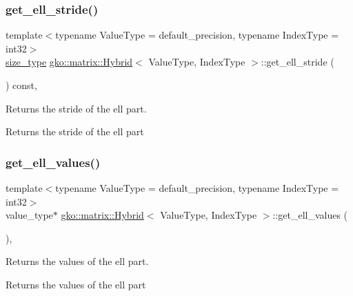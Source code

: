 \subsubsection{\texorpdfstring{get\+\_\+ell\+\_\+stride()}{get\_ell\_stride()}}
{\footnotesize\ttfamily template$<$typename Value\+Type = default\+\_\+precision, typename Index\+Type = int32$>$ \\
\hyperlink{namespacegko_a6e5c95df0ae4e47aab2f604a22d98ee7}{size\+\_\+type} \hyperlink{classgko_1_1matrix_1_1Hybrid}{gko\+::matrix\+::\+Hybrid}$<$ Value\+Type, Index\+Type $>$\+::get\+\_\+ell\+\_\+stride (\begin{DoxyParamCaption}{ }\end{DoxyParamCaption}) const\hspace{0.3cm}{\ttfamily [inline]}, {\ttfamily [noexcept]}}



Returns the stride of the ell part. 

\begin{DoxyReturn}{Returns}
the stride of the ell part 
\end{DoxyReturn}
\mbox{\label{classgko_1_1matrix_1_1Hybrid_a9cd9c8b8dbf8b3c2c014f355faa61474}} 
\subsubsection{\texorpdfstring{get\+\_\+ell\+\_\+values()}{get\_ell\_values()}}
{\footnotesize\ttfamily template$<$typename Value\+Type = default\+\_\+precision, typename Index\+Type = int32$>$ \\
value\+\_\+type$\ast$ \hyperlink{classgko_1_1matrix_1_1Hybrid}{gko\+::matrix\+::\+Hybrid}$<$ Value\+Type, Index\+Type $>$\+::get\+\_\+ell\+\_\+values (\begin{DoxyParamCaption}{ }\end{DoxyParamCaption})\hspace{0.3cm}{\ttfamily [inline]}, {\ttfamily [noexcept]}}



Returns the values of the ell part. 

\begin{DoxyReturn}{Returns}
the values of the ell part 
\end{DoxyReturn}
\mbox{\label{classgko_1_1matrix_1_1Hybrid_a00e86ba08ecfc46dbc9b74b800d10a8d}} 
